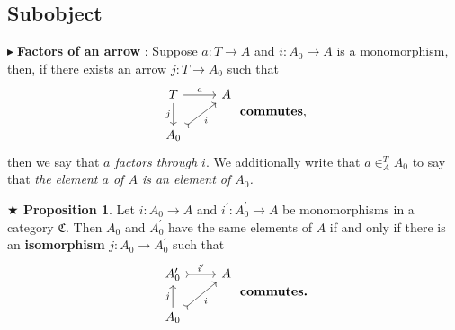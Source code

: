 \documentclass{article}
\theoremstyle{definition}
\theoremstyle{remark}
\theoremstyle{definition}
\theoremstyle{definition}
\newtheorem{proposition}{$\bigstar$ Proposition}
\theoremstyle{definition}
\newcommand{\cat}[1]{\mathfrak{#1}}
\newcommand{\point}[0]{$\blacktriangleright\;$}
\newcommand{\elem}[1]{\in ^{#1}}
\begin{document}
\subsection{Subobject}
\point \textbf{Factors of an arrow} : Suppose $ a : T \to A $ and $ i : A_0 \to A $ is a monomorphism, then, if there exists an arrow $ j: T\to A_0 $ such that
\[\begin{tikzcd}
	T & A \\
	{A_0}
	\arrow["a", from=1-1, to=1-2]
	\arrow["j"', from=1-1, to=2-1]
	\arrow["i"', tail, from=2-1, to=1-2]
\end{tikzcd}\;\text{\textbf{commutes},}\]
then we say that \emph{$ a $ factors through $ i $}. We additionally write that $ a\elem{T}_A A_0 $ to say that \emph{the element $ a  $ of $ A $ is an element of $ A_0 $.}
\newpage

\begin{proposition}\label{P-1}
	Let $i :A_0 \to A $ and $ i^{\prime} : A_0^{\prime} \to A $ be monomorphisms in a category $ \cat{C} $. Then $ A_0 $ and $ A_0^{\prime} $ have the same elements of $ A $ if and only if there is an \textbf{isomorphism} $ j : A_0 \to A_0^{\prime} $ such that
	\[\begin{tikzcd}
		{A_0^{\prime}} & A \\
		{A_0}
		\arrow[tail,"{i}"', from=2-1, to=1-2]
		\arrow[tail,"i^{\prime}", from=1-1, to=1-2]
		\arrow["j", from=2-1, to=1-1]
	\end{tikzcd}\;\text{\textbf{commutes.}}\]
\end{proposition}
\end{document}

